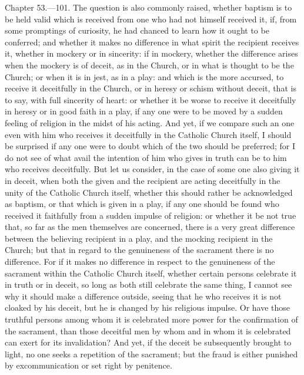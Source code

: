 
Chapter 53.—101. The question is also commonly raised, whether baptism is to be held valid which is received from one who had not himself received it, if, from some promptings of curiosity, he had chanced to learn how it ought to be conferred; and whether it makes no difference in what spirit the recipient receives it, whether in mockery or in sincerity: if in mockery, whether the difference arises when the mockery is of deceit, as in the Church, or in what is thought to be the Church; or when it is in jest, as in a play: and which is the more accursed, to receive it deceitfully in the Church, or in heresy or schism without deceit, that is to say, with full sincerity of heart: or whether it be worse to receive it deceitfully in heresy or in good faith in a play, if any one were to be moved by a sudden feeling of religion in the midst of his acting. And yet, if we compare such an one even with him who receives it deceitfully in the Catholic Church itself, I should be surprised if any one were to doubt which of the two should be preferred; for I do not see of what avail the intention of him who gives in truth can be to him who receives deceitfully. But let us consider, in the case of some one also giving it in deceit, when both the given and the recipient are acting deceitfully in the unity of the Catholic Church itself, whether this should rather be acknowledged as baptism, or that which is given in a play, if any one should be found who received it faithfully from a sudden impulse of religion: or whether it be not true that, so far as the men themselves are concerned, there is a very great difference between the believing recipient in a play, and the mocking recipient in the Church; but that in regard to the genuineness of the sacrament there is no difference. For if it makes no difference in respect to the genuineness of the sacrament within the Catholic Church itself, whether certain persons celebrate it in truth or in deceit, so long as both still celebrate the same thing, I cannot see why it should make a difference outside, seeing that he who receives it is not cloaked by his deceit, but he is changed by his religious impulse. Or have those truthful persons among whom it is celebrated more power for the confirmation of the sacrament, than those deceitful men by whom and in whom it is celebrated can exert for its invalidation? And yet, if the deceit be subsequently brought to light, no one seeks a repetition of the sacrament; but the fraud is either punished by excommunication or set right by penitence.


